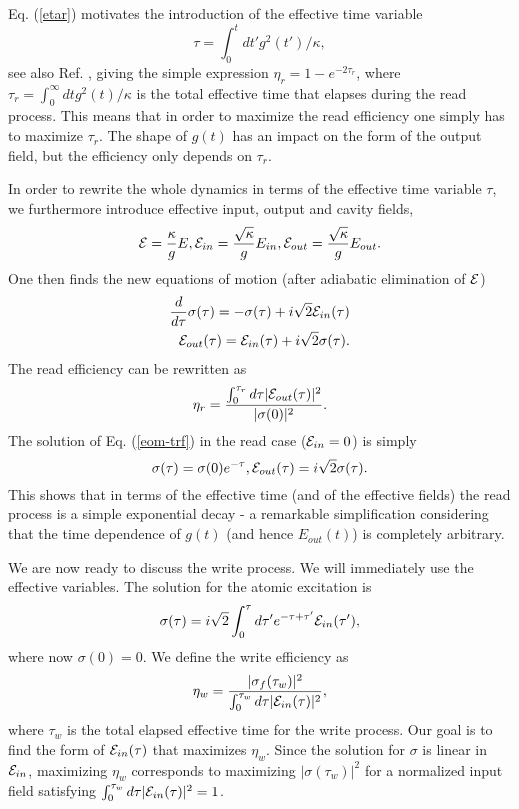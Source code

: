 \documentclass[aps,prl,twocolumn]{revtex4}
\begin{document}
Eq. (\ref{etar}) motivates the introduction of the effective time variable 
\begin{equation}
\tau=\int_0^t dt' g^2(t')/\kappa, \label{tau}
\end{equation} 
 see also Ref. \cite{nunn}, giving the simple expression
$\eta_r=1-e^{-2 \tau_r}$, where $\tau_r=\int_0^{\infty} dt g^2(t)/\kappa$ is the total effective time that elapses during the read process. This means that in order to maximize the read efficiency one simply has to maximize $\tau_r$. The shape of $g(t)$ has an impact on the form of the output field, but the efficiency only depends on $\tau_r$.

In order to rewrite the whole dynamics in terms of the effective time variable $\tau$, we furthermore introduce effective input, output and cavity fields,
\begin{equation}
{\cal E}=\frac{\kappa}{g}E, {\cal E}_{in}=\frac{\sqrt{\kappa}}{g}E_{in},{\cal E}_{out}=\frac{\sqrt{\kappa}}{g} E_{out}. \label{eff-fields}
\end{equation}
One then finds the new equations of motion (after adiabatic elimination of ${\cal E}$)
\begin{eqnarray}
\frac{d}{d\tau} \sigma(\tau)=-\sigma(\tau)+i \sqrt{2} {\cal E}_{in}(\tau) \nonumber\\
{\cal E}_{out}(\tau)={\cal E}_{in}(\tau)+i \sqrt{2} \sigma(\tau).
\label{eom-trf}
\end{eqnarray}
The read efficiency can be rewritten as
\begin{equation}
\eta_r=\frac{\int_0^{\tau_r} d\tau |{\cal E}_{out}(\tau)|^2}{|\sigma(0)|^2}.
\end{equation}
The solution of Eq. (\ref{eom-trf}) in the read case (${\cal E}_{in}=0$) is simply
\begin{equation}
\sigma(\tau)=\sigma(0) e^{-\tau}, {\cal E}_{out}(\tau)=i \sqrt{2} \sigma(\tau).
\end{equation}
This shows that in terms of the effective time (and of the effective fields) the read process is a simple exponential decay - a remarkable simplification considering that the time dependence of $g(t)$ (and hence $E_{out}(t)$) is completely arbitrary.

We are now ready to discuss the write process. We will immediately use the effective variables. The solution for the atomic excitation is
\begin{equation}
\sigma(\tau)=i\sqrt{2} \int_0^{\tau} d\tau' e^{-\tau+\tau'}{\cal E}_{in}(\tau'), \label{sigmatau}
\end{equation}
where now $\sigma(0)=0$. We define the write efficiency as
\begin{equation}
\eta_w=\frac{|\sigma_f(\tau_w)|^2}{\int_0^{\tau_w} d\tau |{\cal E}_{in}(\tau)|^2},
\end{equation}
where $\tau_w$ is the total elapsed effective time for the write process. Our goal is to find the form of ${\cal E}_{in}(\tau)$ that maximizes $\eta_w$. Since the solution for $\sigma$ is linear in ${\cal E}_{in}$, maximizing $\eta_w$ corresponds to maximizing $|\sigma(\tau_w)|^2$ for a normalized input field satisfying $\int_0^{\tau_w} d\tau |{\cal E}_{in}(\tau)|^2=1$.
\end{document}
